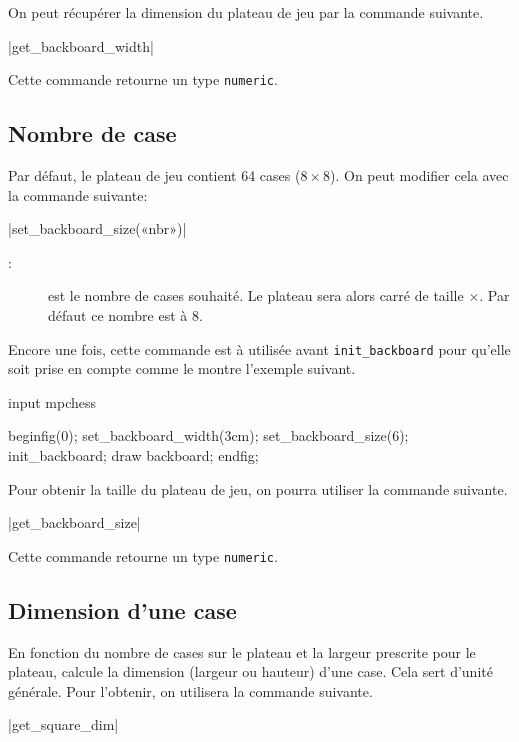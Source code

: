 \documentclass[french]{ltxdoc}
\begin{document}
On peut récupérer la dimension du plateau de jeu par la commande suivante.

\commande|get_backboard_width|\smallskip{}

Cette commande retourne un type \lstinline+numeric+.

\subsection{Nombre de case}
Par défaut, le plateau de jeu contient 64 cases ($8\times 8$). On peut modifier
cela avec la commande suivante:

\commande|set_backboard_size(«nbr»)|
\smallskip{}

\begin{description}
  \item[:] est le nombre de cases souhaité. Le plateau sera alors carré de taille $\times$. Par défaut ce nombre est à 8.
\end{description}

Encore une fois, cette commande est à utilisée avant \lstinline+init_backboard+ pour qu’elle soit prise en compte comme le montre l’exemple suivant.

\begin{ExempleMP}[label=ex:widthcase]
input mpchess

beginfig(0);
set_backboard_width(3cm);
set_backboard_size(6);
init_backboard;
draw backboard;
endfig;
\end{ExempleMP}

Pour obtenir la taille du plateau de jeu, on pourra utiliser la commande
suivante. 

\commande|get_backboard_size|\smallskip{}

Cette commande retourne un type \lstinline+numeric+.

\subsection{Dimension d’une case}

En fonction du nombre de cases sur le plateau et la largeur prescrite pour le
plateau, \mpchess calcule la dimension (largeur ou hauteur) d’une case. Cela
sert d’unité générale. Pour l’obtenir, on utilisera la commande suivante.

\commande|get_square_dim|\smallskip{}
\end{document}
